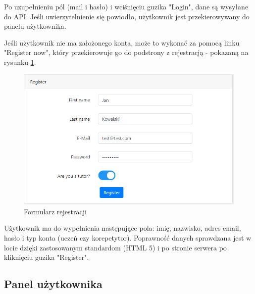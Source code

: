 \documentclass[12pt]{article}
\numberwithin{figure}{section}
\begin{document}
\begin{sloppypar}
Po uzupełnieniu pól (mail i hasło) i wciśnięciu guzika "Login", dane są wysyłane do API. Jeśli uwierzytelnienie się powiodło, użytkownik jest przekierowywany do panelu użytkownika.

Jeśli użytkownik nie ma założonego konta, może to wykonać za pomocą linku "Register now", który przekierowuje go do podstrony z rejestracją - pokazaną na rysunku \ref{fig:register}.
\begin{figure}[H] 
    \centering
    \includegraphics[width=1\textwidth]{images/chapter_4/register.png}
    \caption{Formularz rejestracji}
    \label{fig:register}
\end{figure}

Użytkownik ma do wypełnienia następujące pola: imię, nazwisko, adres email, hasło i typ konta (uczeń czy korepetytor). Poprawność danych sprawdzana jest w locie dzięki zastosowanym standardom (HTML 5) i po stronie serwera po kliknięciu guzika "Register".

\subsection{Panel użytkownika}

\end{sloppypar}
\end{document}
